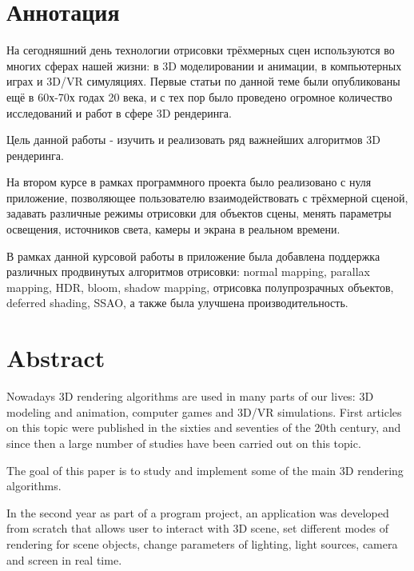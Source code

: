 \documentclass[14pt]{extarticle}
\begin{document}

\makeTitlePage

\renewcommand*\contentsname{Оглавление}
\tableofcontents


\section{Аннотация}
На сегодняшний день технологии отрисовки трёхмерных сцен используются во многих сферах нашей жизни: в 3D моделировании и анимации, в компьютерных играх и 3D/VR симуляциях. Первые статьи по данной теме были опубликованы ещё в 60х-70х годах 20 века, и с тех пор было проведено огромное количество исследований и работ в сфере 3D рендеринга. 

Цель данной работы - изучить и реализовать ряд важнейших алгоритмов 3D рендеринга. 

На втором курсе в рамках программного проекта было реализовано с нуля приложение, позволяющее пользователю взаимодействовать с трёхмерной сценой, задавать различные режимы отрисовки для объектов сцены, менять параметры освещения, источников света, камеры и экрана в реальном времени.

В рамках данной курсовой работы в приложение была добавлена поддержка различных продвинутых алгоритмов отрисовки: normal mapping, parallax mapping, HDR, bloom, shadow mapping, отрисовка полупрозрачных объектов, deferred shading, SSAO, а также была улучшена производительность.

\section*{Abstract}
Nowadays 3D rendering algorithms are used in many parts of our lives: 3D modeling and animation, computer games and 3D/VR simulations. First articles on this topic were published in the sixties and seventies of the 20th century, and since then a large number of studies have been carried out on this topic.

The goal of this paper is to study and implement some of the main 3D rendering algorithms.

In the second year as part of a program project, an application was developed from scratch that allows user to interact with 3D scene, set different modes of rendering for scene objects, change parameters of lighting, light sources, camera and screen in real time.
\end{document}
